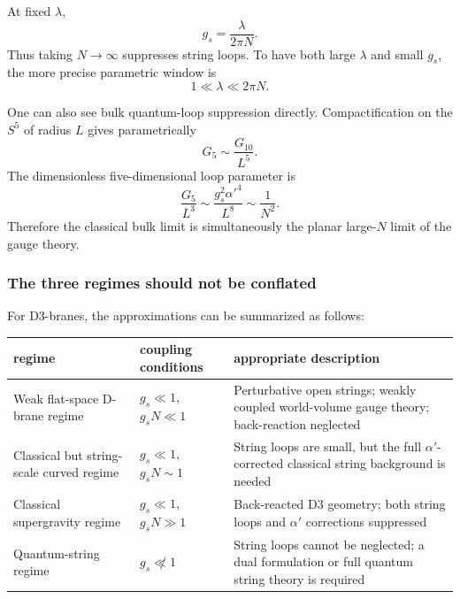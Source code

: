 \documentclass[
  10pt,
  a4paper,
  openany]{book}
\begin{document}
At fixed \(\lambda\), \[
g_s
=\frac{\lambda}{2\pi N}.
\] Thus taking \(N\to\infty\) suppresses string loops. To have both
large \(\lambda\) and small \(g_s\), the more precise parametric window
is \[
\boxed{
1\ll\lambda\ll 2\pi N
}.
\]

One can also see bulk quantum-loop suppression directly.
Compactification on the \(S^5\) of radius \(L\) gives parametrically \[
G_5\sim\frac{G_{10}}{L^5}.
\] The dimensionless five-dimensional loop parameter is \[
\frac{G_5}{L^3}
\sim
\frac{g_s^2\alpha'^4}{L^8}
\sim
\frac1{N^2}.
\] Therefore the classical bulk limit is simultaneously the planar
large-\(N\) limit of the gauge theory.

\subsubsection{The three regimes should not be
conflated}\label{the-three-regimes-should-not-be-conflated}

For D3-branes, the approximations can be summarized as follows:

\begin{longtable}[]{@{}
  >{\raggedright\arraybackslash}p{}
  >{\raggedright\arraybackslash}p{}
  >{\raggedright\arraybackslash}p{}@{}}
\toprule\noalign{}
\begin{minipage}[b]{\linewidth}\raggedright
regime
\end{minipage} & \begin{minipage}[b]{\linewidth}\raggedright
coupling conditions
\end{minipage} & \begin{minipage}[b]{\linewidth}\raggedright
appropriate description
\end{minipage} \\
\midrule\noalign{}
\endhead
\bottomrule\noalign{}
\endlastfoot
Weak flat-space D-brane regime & \(g_s\ll1\), \(g_sN\ll1\) &
Perturbative open strings; weakly coupled world-volume gauge theory;
back-reaction neglected \\
Classical but string-scale curved regime & \(g_s\ll1\), \(g_sN\sim1\) &
String loops are small, but the full \(\alpha'\)-corrected classical
string background is needed \\
Classical supergravity regime & \(g_s\ll1\), \(g_sN\gg1\) & Back-reacted
D3 geometry; both string loops and \(\alpha'\) corrections suppressed \\
Quantum-string regime & \(g_s\not\ll1\) & String loops cannot be
neglected; a dual formulation or full quantum string theory is
required \\
\end{longtable}
\end{document}
